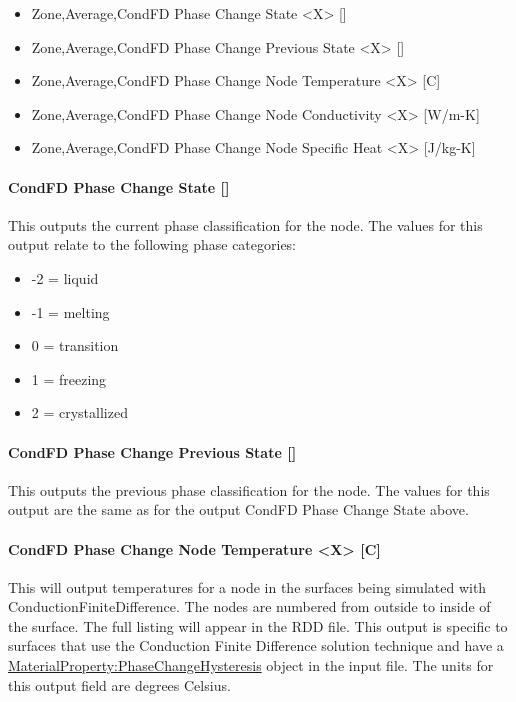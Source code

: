 \begin{itemize}
\item
  Zone,Average,CondFD Phase Change State \textless{}X\textgreater{} {[]}
\item
  Zone,Average,CondFD Phase Change Previous State \textless{}X\textgreater{} {[]}
\item
  Zone,Average,CondFD Phase Change Node Temperature \textless{}X\textgreater{} {[}C{]}
\item
  Zone,Average,CondFD Phase Change Node Conductivity \textless{}X\textgreater{} {[}W/m-K{]}
\item
  Zone,Average,CondFD Phase Change Node Specific Heat \textless{}X\textgreater{} {[}J/kg-K{]}
\end{itemize}

\paragraph{CondFD Phase Change State {[]}}\label{condfd-phase-change-state}

This outputs the current phase classification for the node.  The values for this output relate to the following phase categories:

\begin{itemize}
\item
-2 = liquid
\item
-1 = melting
\item
0 = transition
\item
1 = freezing
\item
2 = crystallized 
\end{itemize}

\paragraph{CondFD Phase Change Previous State {[]}}\label{condfd-phase-change-previous-state}

This outputs the previous phase classification for the node.  The values for this output are the same as for the output CondFD Phase Change State above.

\paragraph{CondFD Phase Change Node Temperature \textless{}X\textgreater{} {[}C{]}}\label{condfd-phase-change-node-temperature-x-c}

This will output temperatures for a node in the surfaces being simulated with ConductionFiniteDifference. The nodes are numbered from outside to inside of the surface.  The full listing will appear in the RDD file.  This output is specific to surfaces that use the Conduction Finite Difference solution technique and have a \hyperref[materialpropertyphasechangehysteresis]{MaterialProperty:PhaseChangeHysteresis} object in the input file.  The units for this output field are degrees Celsius.


